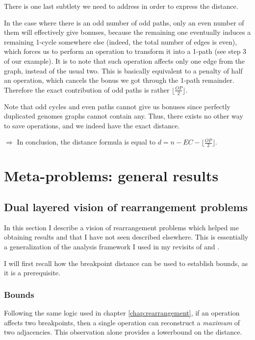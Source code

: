 \documentclass[11pt,final,twoside,nofrench]{thlifl}
\begin{document}
There is one last subtlety we need to address in order to express the distance.

In the case where there is an odd number of odd paths, only an even number of them will effectively give bonuses, because the remaining one eventually induces a remaining 1-cycle somewhere else (indeed, the total number of edges is even), which forces us to perform an operation to transform it into a 1-path (see step 3 of our example). It is to note that such operation affects only one edge from the graph, instead of the usual two. This is basically equivalent to a penalty of half an operation, which cancels the bonus we got through the 1-path remainder. Therefore the exact contribution of odd paths is rather $\lfloor \frac{OP}{2} \rfloor$.

Note that odd cycles and even paths cannot give us bonuses since perfectly duplicated genomes graphs cannot contain any. Thus, there exists no other way to save operations, and we indeed have the exact distance.

$\Rightarrow$ In conclusion, the distance formula is equal to $d = n - EC - \lfloor \frac{OP}{2} \rfloor$.

\section{Meta-problems: general results}

\subsection{Dual layered vision of rearrangement problems}
\label{sec:dl}

In this section I describe a vision of rearrangement problems which helped me obtaining results and that I have not seen described elsewhere. This is essentially a generalization of the analysis framework I used in my revisits of \cite{Christie96} and \cite{Mixtacki08}.

I will first recall how the breakpoint distance can be used to establish bounds, as it is a prerequisite.

\subsubsection{Bounds}

Following the same logic used in chapter \ref{chap:rearrangement}, if an operation affects two breakpoints, then a single operation can reconstruct a \emph{maximum} of two adjacencies. This observation alone provides a lowerbound on the distance.
\end{document}
